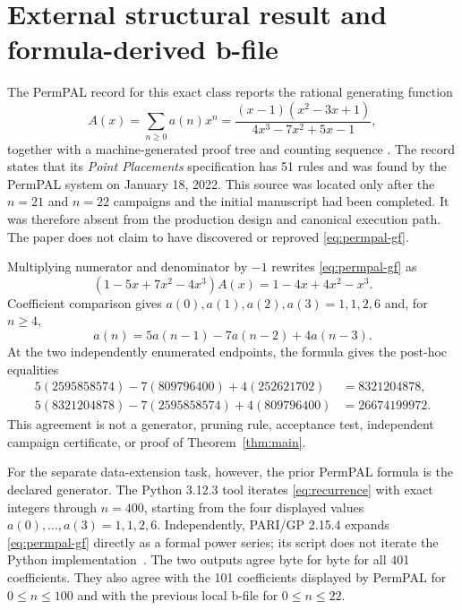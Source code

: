 \documentclass[11pt]{article}
\theoremstyle{definition}
\theoremstyle{remark}
\begin{document}
\section{External structural result and formula-derived b-file}
\label{sec:recurrence}

The PermPAL record for this exact class reports the rational generating
function
\begin{equation}
 A(x)=\sum_{n\geq0}a(n)x^n
 =\frac{(x-1)(x^2-3x+1)}{4x^3-7x^2+5x-1},
 \label{eq:permpal-gf}
\end{equation}
together with a machine-generated proof tree and counting sequence
\cite{albertEtAl2026,permpalA369431Class}.  The record states that its
\emph{Point Placements} specification has 51 rules and was found by the
PermPAL system on January 18, 2022.  This source was located only after
the $n=21$ and $n=22$ campaigns and the initial manuscript had been completed.
It was therefore absent from the production design and canonical execution
path.  The paper does not claim to have discovered or reproved
\eqref{eq:permpal-gf}.

Multiplying numerator and denominator by $-1$ rewrites
\eqref{eq:permpal-gf} as
\[
 (1-5x+7x^2-4x^3)A(x)=1-4x+4x^2-x^3.
\]
Coefficient comparison gives $a(0),a(1),a(2),a(3)=1,1,2,6$ and, for
$n\geq4$,
\begin{equation}
 a(n)=5a(n-1)-7a(n-2)+4a(n-3).
 \label{eq:recurrence}
\end{equation}
At the two independently enumerated endpoints, the formula gives the
post-hoc equalities
\begin{align*}
5(2595858574)-7(809796400)+4(252621702) &= 8321204878,\\
5(8321204878)-7(2595858574)+4(809796400) &= 26674199972.
\end{align*}
This agreement is not a generator, pruning rule, acceptance test, independent
campaign certificate, or proof of Theorem~\ref{thm:main}.

For the separate data-extension task, however, the prior PermPAL formula is
the declared generator.  The Python 3.12.3 tool
 iterates \eqref{eq:recurrence} with exact
integers through $n=400$, starting from the four displayed values
$a(0),\ldots,a(3)=1,1,2,6$.  Independently, PARI/GP 2.15.4 expands
\eqref{eq:permpal-gf} directly as a formal power series; its script does not
iterate the Python implementation~\cite{pythonDocs,pariGp}.  The two outputs
agree byte for byte for all 401 coefficients.  They also agree with the 101
coefficients displayed by PermPAL for $0\leq n\leq100$ and with the previous
local b-file for $0\leq n\leq22$.
\end{document}
